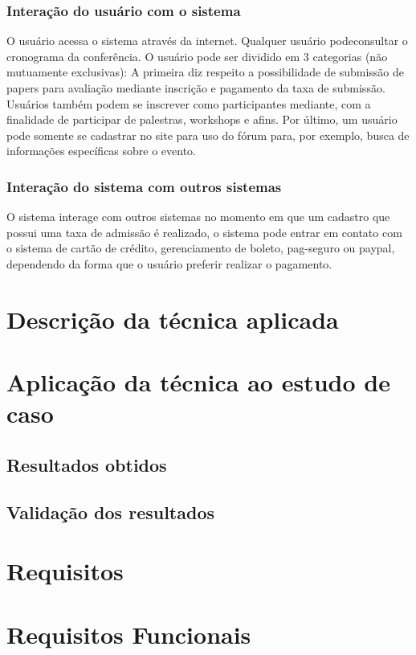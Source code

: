 \documentclass[letter]{article}
\begin{document}
\subsubsection{ Interação do usuário com o sistema}
O usuário acessa o sistema através da internet. Qualquer usuário podeconsultar o cronograma da conferência. O usuário pode ser dividido em 3 categorias (não mutuamente exclusivas): A primeira diz respeito a possibilidade de submissão de papers para avaliação mediante inscrição e pagamento da taxa de submissão. Usuários também podem se inscrever como participantes mediante, com a finalidade de participar de palestras, workshops e afins. Por último, um usuário pode somente se cadastrar no site para uso do fórum para, por exemplo, busca de informações específicas sobre o evento.

\subsubsection{Interação do sistema com outros sistemas}

O sistema interage com outros sistemas no momento em que um cadastro que possui uma taxa de admissão é realizado, o sistema pode entrar em contato com o sistema de cartão de crédito, gerenciamento de boleto, pag-seguro ou paypal, dependendo da forma que o usuário preferir realizar o pagamento.



\section{Descrição da técnica aplicada}
\section{Aplicação da técnica ao estudo de caso}
\subsection{Resultados obtidos}
\subsection{Validação dos resultados}
\section{Requisitos}
\section{Requisitos Funcionais}
\end{document}

